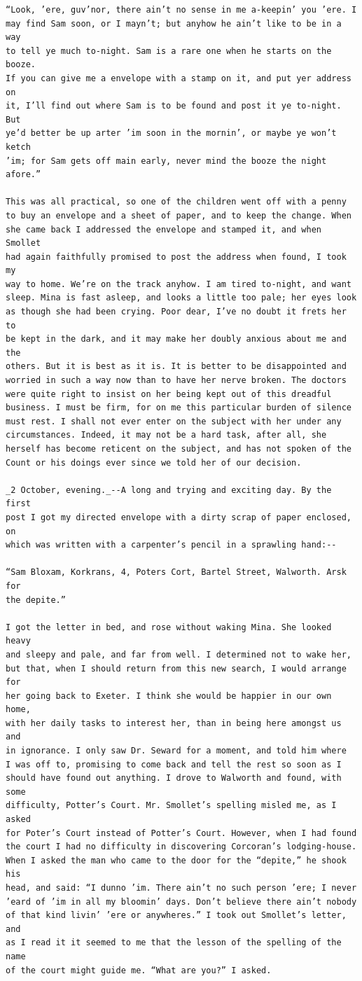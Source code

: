 \documentclass{article}
\begin{document}
\begin{verbatim}
“Look, ’ere, guv’nor, there ain’t no sense in me a-keepin’ you ’ere. I
may find Sam soon, or I mayn’t; but anyhow he ain’t like to be in a way
to tell ye much to-night. Sam is a rare one when he starts on the booze.
If you can give me a envelope with a stamp on it, and put yer address on
it, I’ll find out where Sam is to be found and post it ye to-night. But
ye’d better be up arter ’im soon in the mornin’, or maybe ye won’t ketch
’im; for Sam gets off main early, never mind the booze the night afore.”

This was all practical, so one of the children went off with a penny
to buy an envelope and a sheet of paper, and to keep the change. When
she came back I addressed the envelope and stamped it, and when Smollet
had again faithfully promised to post the address when found, I took my
way to home. We’re on the track anyhow. I am tired to-night, and want
sleep. Mina is fast asleep, and looks a little too pale; her eyes look
as though she had been crying. Poor dear, I’ve no doubt it frets her to
be kept in the dark, and it may make her doubly anxious about me and the
others. But it is best as it is. It is better to be disappointed and
worried in such a way now than to have her nerve broken. The doctors
were quite right to insist on her being kept out of this dreadful
business. I must be firm, for on me this particular burden of silence
must rest. I shall not ever enter on the subject with her under any
circumstances. Indeed, it may not be a hard task, after all, she
herself has become reticent on the subject, and has not spoken of the
Count or his doings ever since we told her of our decision.

_2 October, evening._--A long and trying and exciting day. By the first
post I got my directed envelope with a dirty scrap of paper enclosed, on
which was written with a carpenter’s pencil in a sprawling hand:--

“Sam Bloxam, Korkrans, 4, Poters Cort, Bartel Street, Walworth. Arsk for
the depite.”

I got the letter in bed, and rose without waking Mina. She looked heavy
and sleepy and pale, and far from well. I determined not to wake her,
but that, when I should return from this new search, I would arrange for
her going back to Exeter. I think she would be happier in our own home,
with her daily tasks to interest her, than in being here amongst us and
in ignorance. I only saw Dr. Seward for a moment, and told him where
I was off to, promising to come back and tell the rest so soon as I
should have found out anything. I drove to Walworth and found, with some
difficulty, Potter’s Court. Mr. Smollet’s spelling misled me, as I asked
for Poter’s Court instead of Potter’s Court. However, when I had found
the court I had no difficulty in discovering Corcoran’s lodging-house.
When I asked the man who came to the door for the “depite,” he shook his
head, and said: “I dunno ’im. There ain’t no such person ’ere; I never
’eard of ’im in all my bloomin’ days. Don’t believe there ain’t nobody
of that kind livin’ ’ere or anywheres.” I took out Smollet’s letter, and
as I read it it seemed to me that the lesson of the spelling of the name
of the court might guide me. “What are you?” I asked.


\end{verbatim}
\end{document}
